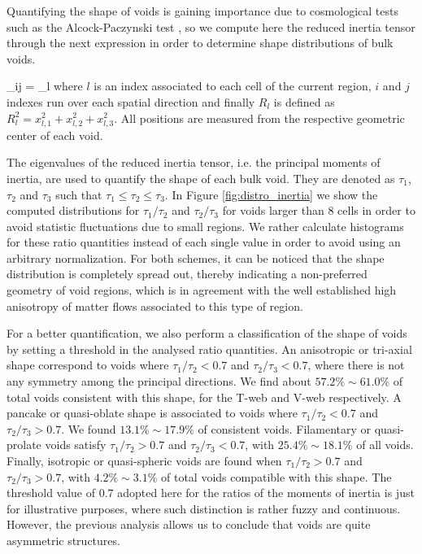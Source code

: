 \documentclass[a4,useAMS,usenatbib,usegraphicx]{latex/mn2e}
\begin{document}
Quantifying the shape of voids is gaining importance due to cosmological 
tests such as the Alcock-Paczynski test \SRKED{[Sutter, et.al (2012)]}, so 
we compute here the reduced inertia tensor through the next expression in 
order to determine shape distributions of bulk voids.


{ \tau_{ij} = \sum_l  }
where $l$ is an index associated to each cell of the current region, 
$i$ and $j$ indexes run over each spatial direction and finally 
$R_l$ is defined as $R_l^2 = x_{l,1}^2 + x_{l,2}^2 + x_{l,3}^2$. All 
positions are measured from the respective geometric center of each void.


The eigenvalues of the reduced inertia tensor, i.e. the principal moments
of inertia, are used to quantify the shape of each bulk void. They are 
denoted as $\tau_1$, $\tau_2$ and $\tau_3$ such that $\tau_1 \leq \tau_2
\leq \tau_3$. In Figure \ref{fig:distro_inertia} we show the computed
distributions for $\tau_1/\tau_2$ and $\tau_2/\tau_3$ for voids larger 
than 8 cells in order to avoid statistic fluctuations due to small regions.
We rather calculate histograms for these ratio quantities instead of each 
single value in order to avoid using an arbitrary normalization. For both 
schemes, it can be noticed that the shape distribution is completely 
spread out, thereby indicating a non-preferred geometry of void regions, 
which is in agreement with the well established high anisotropy of matter 
flows associated to this type of region. 


For a better quantification, we also perform a classification of the shape 
of voids by setting a threshold in the analysed ratio quantities. An 
anisotropic or tri-axial shape correspond to voids where $\tau_1/\tau_2 < 
0.7$ and $\tau_2/\tau_3 < 0.7$, where there is not any symmetry among the
principal directions. We find about $57.2\% \sim 61.0\%$ of total voids 
consistent with this shape, for the T-web and V-web respectively. A 
pancake or quasi-oblate shape is associated to voids where $\tau_1/\tau_2 
< 0.7$ and $\tau_2/\tau_3 > 0.7$. We found $13.1\% \sim 17.9\%$ of 
consistent voids. Filamentary or quasi-prolate voids satisfy $\tau_1/\tau_2 
> 0.7$ and $\tau_2/\tau_3 < 0.7$, with $25.4\% \sim 18.1\%$ of all voids.
Finally, isotropic or quasi-spheric voids are found when $\tau_1/\tau_2 
> 0.7$ and $\tau_2/\tau_3 > 0.7$, with $4.2\% \sim 3.1\%$ of total voids 
compatible with this shape. The threshold value of $0.7$ adopted here for
the ratios of the moments of inertia is just for illustrative purposes, 
where such distinction is rather fuzzy and continuous. However, the 
previous analysis allows us to conclude that voids are quite asymmetric 
structures.
\end{document}
